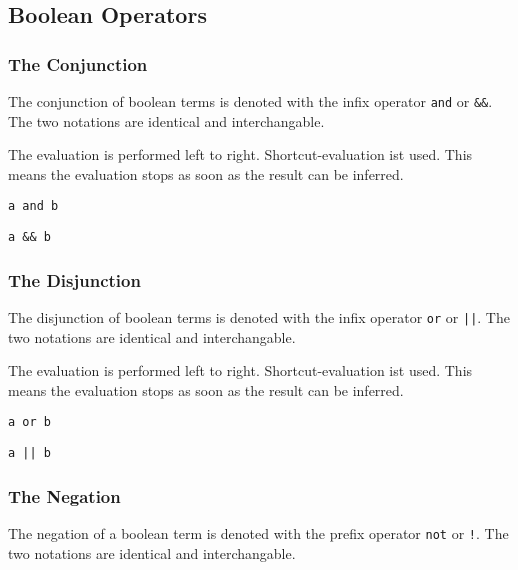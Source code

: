 \documentclass[11pt,a4paper]{scrbook}
\begin{document}

\subsection{Boolean Operators}

\subsubsection{The Conjunction}

The conjunction of boolean terms is denoted with the infix operator \verb|and|
or \verb|&&|. The two notations are identical and interchangable.

The evaluation is performed left to right. Shortcut-evaluation ist used. This
means the evaluation stops as soon as the result can be inferred.

\begin{lstlisting}[language=BibTool]
a and b
\end{lstlisting}

\begin{lstlisting}[language=BibTool]
a && b
\end{lstlisting}


\subsubsection{The Disjunction}

The disjunction of boolean terms is denoted with the infix operator \verb|or|
or \verb'||'. The two notations are identical and interchangable.

The evaluation is performed left to right. Shortcut-evaluation ist used. This
means the evaluation stops as soon as the result can be inferred.

\begin{lstlisting}[language=BibTool]
a or b
\end{lstlisting}

\begin{lstlisting}[language=BibTool]
a || b
\end{lstlisting}

\subsubsection{The Negation}

The negation of a boolean term is denoted with the prefix operator \verb|not|
or \verb|!|. The two notations are identical and interchangable.
\end{document}
